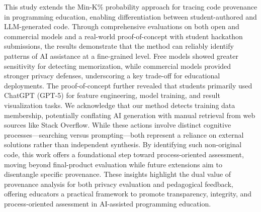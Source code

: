 \documentclass[runningheads]{llncs}
\begin{document}
This study extends the Min-K\% probability approach for tracing code provenance in programming education, enabling differentiation between student-authored and LLM-generated code. Through comprehensive evaluations on both open and commercial models and a real-world proof-of-concept with student hackathon submissions, the results demonstrate that the method can reliably identify patterns of AI assistance at a fine-grained level. Free models showed greater sensitivity for detecting memorization, while commercial models provided stronger privacy defenses, underscoring a key trade-off for educational deployments. The proof-of-concept further revealed that students primarily used ChatGPT (GPT-5) for feature engineering, model training, and result visualization tasks. We acknowledge that our method detects training data membership, potentially conflating AI generation with manual retrieval from web sources like Stack Overflow. While these actions involve distinct cognitive processes—searching versus prompting—both represent a reliance on external solutions rather than independent synthesis. By identifying such non-original code, this work offers a foundational step toward process-oriented assessment, moving beyond final-product evaluation while future extensions aim to disentangle specific provenance. These insights highlight the dual value of provenance analysis for both privacy evaluation and pedagogical feedback, offering educators a practical framework to promote transparency, integrity, and process-oriented assessment in AI-assisted programming education.








\end{document}
